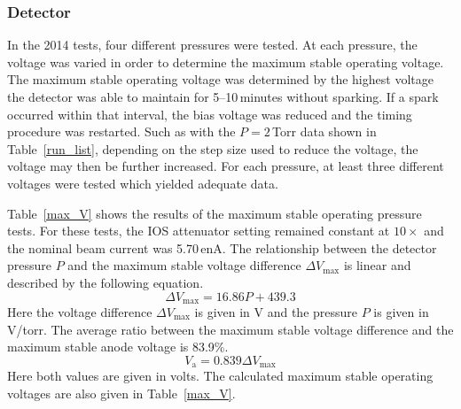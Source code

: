 \subsubsection{Detector}
In the 2014 tests, four different pressures were tested. At each pressure, the voltage was varied in order %
to determine the maximum stable operating voltage. The maximum stable operating voltage was determined by the highest voltage the detector was able to maintain for 5--10\,minutes without sparking. If a spark occurred within that interval, the bias voltage was reduced and the timing procedure was restarted. Such as with the $P=2$\,Torr data shown in Table~\ref{run_list}, depending on the step size used to reduce the voltage, the voltage may then be further increased. For each pressure, at least three different voltages were tested which yielded adequate data. 

Table~\ref{max_V} shows the results of the maximum stable operating pressure tests. For these tests, the IOS attenuator setting remained constant at $10\times$ and the nominal beam current was 5.70\,enA. The relationship between the detector pressure $P$ and the maximum stable voltage difference $\Delta V_\textrm{max}$ is linear and described by the following equation.
\begin{equation}
\Delta V_\textrm{max}=16.86 P%
 +  439.3%
\label{eq:vmax}
\end{equation}
Here the voltage difference $\Delta V_\textrm{max}$ is given in V and the pressure $P$ is given in V/torr. %
The average ratio between the maximum stable voltage difference and the maximum stable anode voltage is 83.9\%.
\begin{equation}
V_\textrm{a}=0.839 \Delta V_\textrm{max}
\label{eq:vamax}
\end{equation}
Here both values are given in volts. The calculated maximum stable operating voltages are also %
given in Table~\ref{max_V}.

